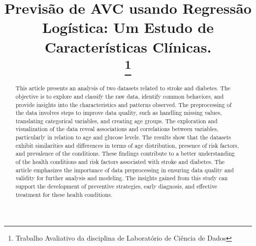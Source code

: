\documentclass[conference]{IEEEtran}
\begin{document}
\title{Previsão de AVC usando Regressão Logística: Um Estudo de Características Clínicas.\\


\thanks{Trabalho Avaliativo da disciplina de Laboratório de Ciência de Dados}
}

\author{
\and
{}

}

\maketitle

\begin{abstract}
This article presents an analysis of two datasets related to stroke and diabetes. The objective is to explore and classify the raw data, identify common behaviors, and provide insights into the characteristics and patterns observed. The preprocessing of the data involves steps to improve data quality, such as handling missing values, translating categorical variables, and creating age groups. The exploration and visualization of the data reveal associations and correlations between variables, particularly in relation to age and glucose levels. The results show that the datasets exhibit similarities and differences in terms of age distribution, presence of risk factors, and prevalence of the conditions. These findings contribute to a better understanding of the health conditions and risk factors associated with stroke and diabetes. The article emphasizes the importance of data preprocessing in ensuring data quality and validity for further analysis and modeling. The insights gained from this study can support the development of preventive strategies, early diagnosis, and effective treatment for these health conditions.
\end{abstract}
\end{document}
